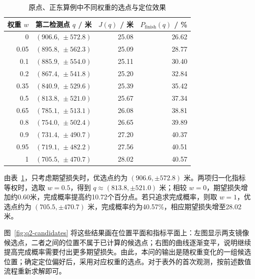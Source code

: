 \begin{table}[htbp]
  \centering
  \caption{原点、正东算例中不同权重的选点与定位效果}
  \label{tab:q2-origin-weights}
  \small
  \renewcommand{\arraystretch}{1.08}
  \begin{tabular}{rrrr}
    \toprule
    权重 \(w\) & 第二检测点 \(q\) / 米 & \(J(q)\) / 米 & \(P_{\mathrm{finish}}(q)\) / \% \\
    \midrule
    0 & \((906.6,\,\pm572.8)\) & 25.08 & 26.62 \\
    0.05 & \((895.8,\,\pm562.3)\) & 25.09 & 28.77 \\
    0.1 & \((885.9,\,\pm554.0)\) & 25.11 & 30.40 \\
    0.2 & \((867.4,\,\pm541.8)\) & 25.20 & 32.84 \\
    0.35 & \((840.9,\,\pm529.6)\) & 25.39 & 35.42 \\
    0.5 & \((813.8,\,\pm521.0)\) & 25.67 & 37.34 \\
    0.65 & \((785.1,\,\pm513.1)\) & 26.08 & 38.81 \\
    0.8 & \((754.0,\,\pm502.4)\) & 26.65 & 39.89 \\
    0.9 & \((731.4,\,\pm490.7)\) & 27.20 & 40.37 \\
    0.95 & \((719.1,\,\pm482.2)\) & 27.56 & 40.51 \\
    1 & \((705.5,\,\pm470.7)\) & 28.02 & 40.57 \\
    \bottomrule
  \end{tabular}
\end{table}

由表~\ref{tab:q2-origin-weights}，只考虑期望损失时，优选点约为 \((906.6,\pm572.8)\) 米。两项归一化指标等权时，选取 \(w=0.5\)，得到 \(q\approx(813.8,\pm521.0)\) 米；相较 \(w=0\)，期望损失增加约0.60米，完成概率提高约10.72个百分点。若只追求完成概率，则取 \(w=1\)，优选点约为 \((705.5,\pm470.7)\) 米，完成概率约为40.57\%，相应期望损失增至28.02米。

图~\ref{fig:q2-candidates} 将这些结果画在位置平面和指标平面上：左图显示两支镜像候选点，二者之间的位置不属于已计算的候选点；右图的曲线逐渐变平，说明继续提高完成概率需要付出更多期望损失。由此，本问的输出是随权重变化的一组候选位置；确定定位偏好后，采用对应权重的选点。对于表外的首次观测，按前述数值流程重新求解即可。

